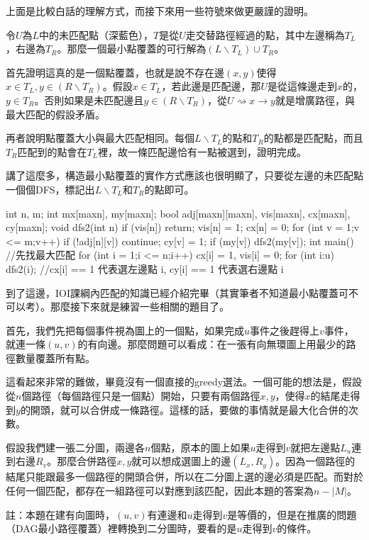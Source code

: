 \documentclass[main.tex]{subfiles}
\begin{document}
上面是比較白話的理解方式，而接下來用一些符號來做更嚴謹的證明。
\par 令$U$為$L$中的未匹配點（深藍色），$T$是從$U$走交替路徑經過的點，其中左邊稱為$T_L$，右邊為$T_R$。那麼一個最小點覆蓋的可行解為$(L \backslash T_L) \cup T_R$。
\par 首先證明這真的是一個點覆蓋，也就是說不存在邊$(x, y)$使得$x \in T_L,y \in (R \backslash T_R)$。假設$x \in T_L$，若此邊是匹配邊，那$U$是從這條邊走到$x$的，$y \in T_R$。否則如果是未匹配邊且$y \in (R \backslash T_R)$，從$U 	\rightsquigarrow x \rightarrow y$就是增廣路徑，與最大匹配的假設矛盾。
\par 再者說明點覆蓋大小與最大匹配相同。每個$L \backslash T_L$的點和$T_R$的點都是匹配點，而且$T_R$匹配到的點會在$T_L$裡，故一條匹配邊恰有一點被選到，證明完成。
\par 講了這麼多，構造最小點覆蓋的實作方式應該也很明顯了，只要從左邊的未匹配點一個個DFS，標記出$L \backslash T_L$和$T_R$的點即可。
\begin{C++}
int n, m;
int mx[maxn], my[maxn];
bool adj[maxn][maxn], vis[maxn], cx[maxn], cy[maxn]; 
void dfs2(int n) {
	if (vis[n]) return;
	vis[n] = 1;
	cx[n] = 0;
	for (int v = 1;v <= m;v++) {
		if (!adj[n][v]) continue;
		cy[v] = 1;
		if (my[v]) {
			dfs2(my[v]);
		}
	}
}
int main() {
    //先找最大匹配
    for (int i = 1;i <= n;i++) {
    	cx[i] = 1, vis[i] = 0;
    }
	for (int i:u) dfs2(i);
	//cx[i] == 1 代表選左邊點 i, cy[i] == 1 代表選右邊點 i
}
\end{C++}

到了這邊，IOI課綱內匹配的知識已經介紹完畢（其實筆者不知道最小點覆蓋可不可以考）。那麼接下來就是練習一些相關的題目了。
\par 首先，我們先把每個事件視為圖上的一個點，如果完成$u$事件之後趕得上$v$事件，就連一條$(u, v)$的有向邊。那麼問題可以看成：在一張有向無環圖上用最少的路徑數量覆蓋所有點。
\par 這看起來非常的難做，畢竟沒有一個直接的greedy選法。一個可能的想法是，假設從$n$個路徑（每個路徑只是一個點）開始，只要有兩個路徑$x, y$，使得$x$的結尾走得到$y$的開頭，就可以合併成一條路徑。這樣的話，要做的事情就是最大化合併的次數。
\par 假設我們建一張二分圖，兩邊各$n$個點，原本的圖上如果$u$走得到$v$就把左邊點$L_u$連到右邊$R_v$。那麼合併路徑$x, y$就可以想成選圖上的邊$(L_x, R_y)$。因為一個路徑的結尾只能跟最多一個路徑的開頭合併，所以在二分圖上選的邊必須是匹配。而對於任何一個匹配，都存在一組路徑可以對應到該匹配，因此本題的答案為$n - |M|$。
\par 註：本題在建有向圖時，$(u, v)$有連邊和$u$走得到$v$是等價的，但是在推廣的問題（DAG最小路徑覆蓋）裡轉換到二分圖時，要看的是$u$走得到$v$的條件。
\end{document}
